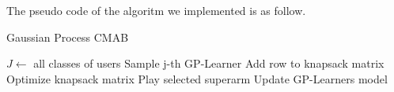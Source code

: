 The pseudo code of the algoritm we implemented is as follow.
\begin{algorithm}
	\caption{Gaussian Process CMAB}
	\begin{algorithmic}[1]
		\STATE $J\gets ${ all classes of users}
			\STATE Sample j-th GP-Learner
			\STATE Add row to knapsack matrix
			\ENDFOR
			\STATE Optimize knapsack matrix
			\STATE Play selected superarm
			\STATE Update GP-Learners model
		\ENDFOR
	\end{algorithmic}
\end{algorithm}